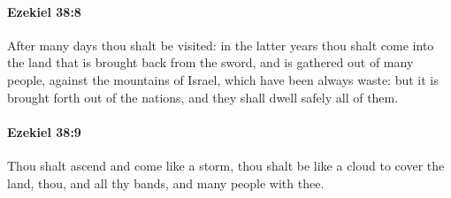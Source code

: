 		\paragraph{Ezekiel 38:8} %
			\label{EZEKIEL-38-8}

			After many days thou shalt be visited: in the latter years thou shalt come into the land that is brought back from the sword, and is gathered out of many people, against the mountains of Israel, which have been always waste: but it is brought forth out of the nations, and they shall dwell safely all of them.


		\paragraph{Ezekiel 38:9} %
			\label{EZEKIEL-38-9}

			Thou shalt ascend and come like a storm, thou shalt be like a cloud to cover the land, thou, and all thy bands, and many people with thee.

